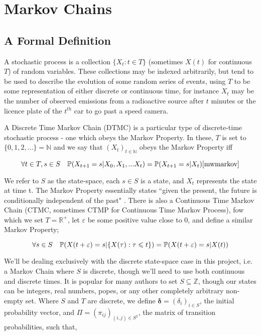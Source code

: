 \section{Markov Chains}

\subsection{A Formal Definition}

A stochastic process \cite[p590]{doob96} is a collection $\{X_t : t \in T\}$ (sometimes $X(t)$ for continuous $T$) of random variables. These collections may be indexed arbitrarily, but tend to be used to describe the evolution of some random series of events, using $T$ to be some representation of either discrete or continuous time, for instance $X_t$ may be the number of observed emissions from a radioactive source after $t$ minutes or the licence plate of the $t^{th}$ car to go past a speed camera.

A Discrete Time Markov Chain (DTMC) is a particular type of discrete-time stochastic process - one which obeys the Markov Property. In these, $T$ is set to $\{0,1,2,...\}=\mathbb{N}$ and we say that $(X_t)_{t \in \mathbb{N}}$ obeys the Markov Property iff

$$
\forall t \in T, s \in S \quad \mathbb{P} (X_{t+1} = s | X_0, X_1, ... X_t) = \mathbb{P} (X_{t+1} = s | X_t)\cite{mwmarkov}
$$

We refer to $S$ as the state-space, each $s \in S$ is a state, and $X_t$ represents the state at time t. The Markov Property essentially states ``given the present, the future is conditionally independent of the past" \cite{mwmarkov}. There is also a Continuous Time Markov Chain (CTMC, sometimes CTMP for Continuous Time Markov Process), fow which we set $T=\mathbb{R}^{+}$, let $\varepsilon$ be some positive value close to 0, and define a similar Markov Property;

$$
\forall s \in S \quad \mathbb{P} (X(t+\varepsilon) = s | \{X(\tau) : \tau \leqslant t\}) = \mathbb{P} (X(t+\varepsilon) = s | X(t))
$$

We'll be dealing exclusively with the discrete state-space case in this project, i.e. a Markov Chain where $S$ is discrete, though we'll need to use both continuous and discrete times. It is popular for many authors to set $S \subseteq \mathbb{Z}$, though our states can be integers, real numbers, popes, or any other completely arbitrary non-empty set. Where $S$ and $T$ are discrete, we define $\bm{\delta} = (\delta_i)_{i \in S}$, the initial probability vector, and $\Pi = (\pi_{ij})_{(i,j) \in S^2}$, the matrix of transition probabilities, such that,

